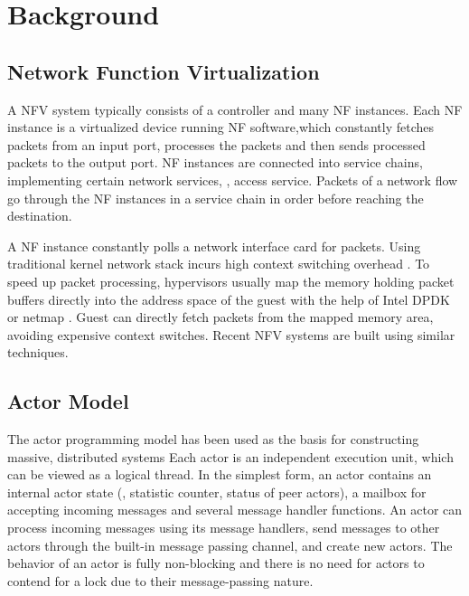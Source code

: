 \section{Background}
\label{sec:background}

\subsection{Network Function Virtualization}

A NFV system \cite{nfv-white-paper} typically consists of a controller and
many NF instances. Each NF instance is a virtualized device running NF software,which constantly fetches
packets from an input port, processes the packets and then sends
processed packets to the output port. NF instances are connected into service chains, implementing certain network services, \eg, access service. Packets of a network flow go through the NF instances in a service chain in order before reaching the destination.


A NF instance constantly polls a network interface card for packets.
Using traditional kernel network stack incurs high context switching overhead
\cite{martins2014clickos}. To speed up packet processing, hypervisors
usually map the memory holding packet buffers directly into the address space of
the guest with the help of Intel DPDK\cite{dpdk} or netmap \cite{netmap}. Guest
can directly fetch packets from the mapped memory area, avoiding expensive
context switches. Recent NFV systems \cite{palkar2015e2, Han:EECS-2015-155,
sherry2015rollback, martins2014clickos, hwang2015netvm} are built using
similar techniques.

\subsection{Actor Model}

The actor programming model has been used as the basis for constructing massive, distributed
systems\cite{actor-wiki, akka, newell2016optimizing} %
Each actor is an independent execution unit, which can be
viewed as a logical thread. In the simplest form, an actor contains an internal
actor state (\eg, statistic counter, status of peer actors), a mailbox for accepting incoming messages and several message
handler functions. An actor can process incoming messages using its message
handlers, send messages to other actors through the built-in message passing channel, and create new actors. The behavior of
an actor is fully non-blocking and there is no need for actors to contend for a lock due to their message-passing nature.  %

